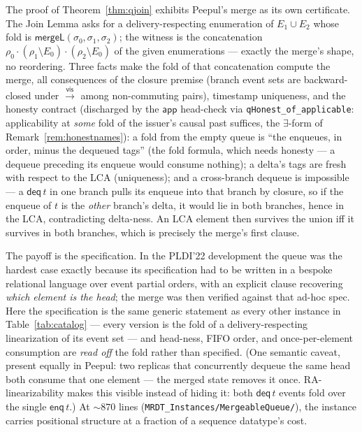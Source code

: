 \documentclass[11pt]{article}
\newcommand{\vis}{\xrightarrow{\mathsf{vis}}}
\newcommand{\lean}[1]{\texttt{#1}}
\newcommand{\app}{\mathsf{app}}
\begin{document}
The proof of Theorem~\ref{thm:qjoin} exhibits Peepul's merge as its own
certificate. The Join Lemma
asks for a delivery-respecting enumeration of $E_1 \cup E_2$ whose fold is
$\mathsf{mergeL}(\sigma_0, \sigma_1, \sigma_2)$; the witness is the
concatenation $\rho_0 \cdot (\rho_1 \setminus E_0) \cdot (\rho_2 \setminus
E_0)$ of the given enumerations --- exactly the merge's shape, no
reordering. Three facts make the fold of that concatenation compute the
merge, all consequences of the closure premise (branch event sets are
backward-closed under $\vis$ among non-commuting pairs), timestamp
uniqueness, and the honesty contract (discharged by the $\app$ head-check via
\lean{qHonest\_of\_applicable}: applicability at \emph{some} fold of the
issuer's causal past suffices, the $\exists$-form of
Remark~\ref{rem:honestnames}): a fold from the empty queue is ``the
enqueues, in order, minus the dequeued tags'' (the fold formula, which
needs honesty --- a dequeue preceding its enqueue would consume nothing); a
delta's tags are fresh with respect to the LCA (uniqueness); and a
cross-branch dequeue is impossible --- a $\mathsf{deq}\,t$ in one branch
pulls its enqueue into that branch by closure, so if the enqueue of $t$ is
the \emph{other} branch's delta, it would lie in both branches, hence in
the LCA, contradicting delta-ness. An LCA element then survives the union
iff it survives in both branches, which is precisely the merge's first
clause.

The payoff is the specification. In the PLDI'22 development the queue was
the hardest case exactly because its specification had to be written in a
bespoke relational language over event partial orders, with an explicit
clause recovering \emph{which element is the head}; the merge was then
verified against that ad-hoc spec. Here the specification is the same
generic statement as every other instance in
Table~\ref{tab:catalog} --- every version is the fold of a
delivery-respecting linearization of its event set --- and head-ness,
FIFO order, and once-per-element consumption are \emph{read off} the fold
rather than specified. (One semantic caveat, present equally in Peepul:
two replicas that concurrently dequeue the same head both consume that one
element --- the merged state removes it once. RA-linearizability makes this
visible instead of hiding it: both $\mathsf{deq}\,t$ events fold over the
single $\mathsf{enq}\,t$.) At ${\sim}870$ lines
(\lean{MRDT\_Instances/MergeableQueue/}), the instance carries positional
structure at a fraction of a sequence datatype's cost.
\end{document}
